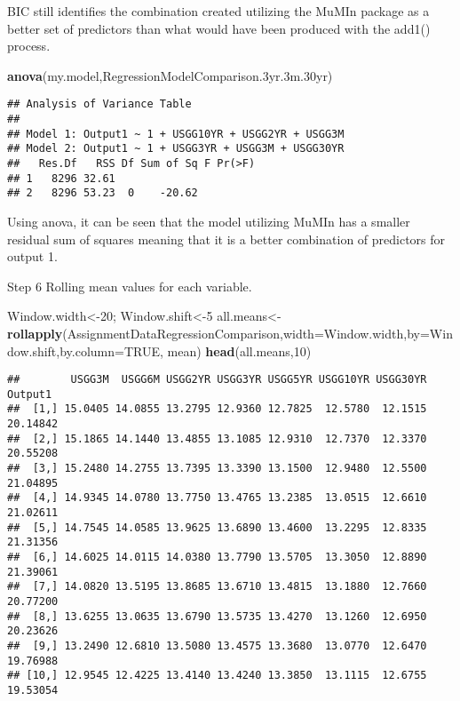 \documentclass[]{article}
\newenvironment{Shaded}{\begin{snugshade}}{\end{snugshade}}
\newcommand{\KeywordTok}[1]{\textcolor[rgb]{0.13,0.29,0.53}{\textbf{#1}}}
\newcommand{\DataTypeTok}[1]{\textcolor[rgb]{0.13,0.29,0.53}{#1}}
\newcommand{\DecValTok}[1]{\textcolor[rgb]{0.00,0.00,0.81}{#1}}
\newcommand{\OtherTok}[1]{\textcolor[rgb]{0.56,0.35,0.01}{#1}}
\newcommand{\NormalTok}[1]{#1}
\begin{document}
BIC still identifies the combination created utilizing the MuMIn package
as a better set of predictors than what would have been produced with
the add1() process.

\begin{Shaded}
\begin{Highlighting}[]
\KeywordTok{anova}\NormalTok{(my.model,RegressionModelComparison.3yr.3m.30yr)}
\end{Highlighting}
\end{Shaded}

\begin{verbatim}
## Analysis of Variance Table
## 
## Model 1: Output1 ~ 1 + USGG10YR + USGG2YR + USGG3M
## Model 2: Output1 ~ 1 + USGG3YR + USGG3M + USGG30YR
##   Res.Df   RSS Df Sum of Sq F Pr(>F)
## 1   8296 32.61                      
## 2   8296 53.23  0    -20.62
\end{verbatim}

Using anova, it can be seen that the model utilizing MuMIn has a smaller
residual sum of squares meaning that it is a better combination of
predictors for output 1.

Step 6 Rolling mean values for each variable.

\begin{Shaded}
\begin{Highlighting}[]
\NormalTok{Window.width<-}\DecValTok{20}\NormalTok{; Window.shift<-}\DecValTok{5}
\NormalTok{all.means<-}\KeywordTok{rollapply}\NormalTok{(AssignmentDataRegressionComparison,}\DataTypeTok{width=}\NormalTok{Window.width,}\DataTypeTok{by=}\NormalTok{Window.shift,}\DataTypeTok{by.column=}\OtherTok{TRUE}\NormalTok{, mean)}
\KeywordTok{head}\NormalTok{(all.means,}\DecValTok{10}\NormalTok{)}
\end{Highlighting}
\end{Shaded}

\begin{verbatim}
##        USGG3M  USGG6M USGG2YR USGG3YR USGG5YR USGG10YR USGG30YR  Output1
##  [1,] 15.0405 14.0855 13.2795 12.9360 12.7825  12.5780  12.1515 20.14842
##  [2,] 15.1865 14.1440 13.4855 13.1085 12.9310  12.7370  12.3370 20.55208
##  [3,] 15.2480 14.2755 13.7395 13.3390 13.1500  12.9480  12.5500 21.04895
##  [4,] 14.9345 14.0780 13.7750 13.4765 13.2385  13.0515  12.6610 21.02611
##  [5,] 14.7545 14.0585 13.9625 13.6890 13.4600  13.2295  12.8335 21.31356
##  [6,] 14.6025 14.0115 14.0380 13.7790 13.5705  13.3050  12.8890 21.39061
##  [7,] 14.0820 13.5195 13.8685 13.6710 13.4815  13.1880  12.7660 20.77200
##  [8,] 13.6255 13.0635 13.6790 13.5735 13.4270  13.1260  12.6950 20.23626
##  [9,] 13.2490 12.6810 13.5080 13.4575 13.3680  13.0770  12.6470 19.76988
## [10,] 12.9545 12.4225 13.4140 13.4240 13.3850  13.1115  12.6755 19.53054
\end{verbatim}
\end{document}
